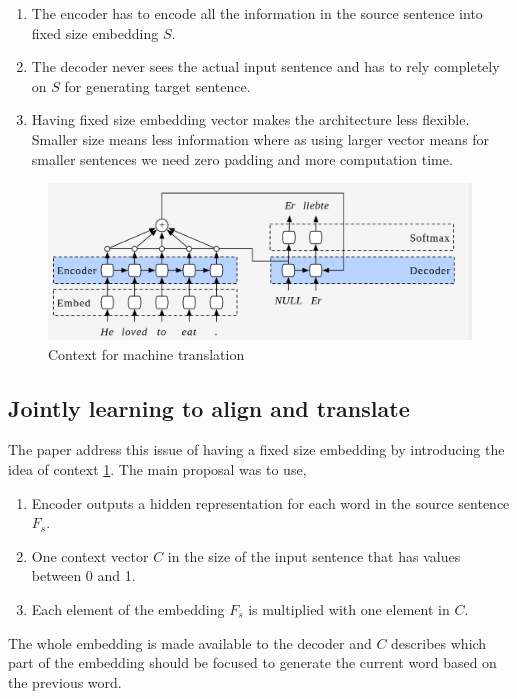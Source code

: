 \documentclass[a4paper]{article}
\begin{document}
\begin{enumerate}
  \item The  encoder  has to  encode all the  information in the source sentence
        into fixed size embedding $S$.
  \item The decoder  never  sees  the  actual  input  sentence  and  has to rely
        completely on $S$ for generating target sentence.
  \item Having fixed size embedding vector makes the architecture less flexible.
        Smaller size means less  information where  as using larger vector means
        for smaller sentences we need zero padding and more computation time.
\end{enumerate}


\begin{figure}
  \includegraphics[width=.99\linewidth]{img/context.png}
  \caption{Context for machine translation}
  \label{fig:context}
\end{figure}


\subsection{Jointly learning to align and translate} \label{sec:JT}
The paper  \cite{bahdanau2014neural}  address this  issue of having a fixed size
embedding  by  introducing  the  idea of  context  \ref{fig:context}.  The  main
proposal was to use,


\begin{enumerate}
  \item Encoder  outputs a  hidden  representation  for  each word in the source
        sentence $F_s$.
  \item One context vector $C$ in the size of the input sentence that has values
        between 0 and 1.
  \item Each element of the embedding  $F_s$  is multiplied with one  element in
        $C$.
\end{enumerate}


The whole embedding  is made available  to  the decoder and $C$ describes  which
part of the embedding should be focused to generate  the current  word based  on
the previous word.
\end{document}

